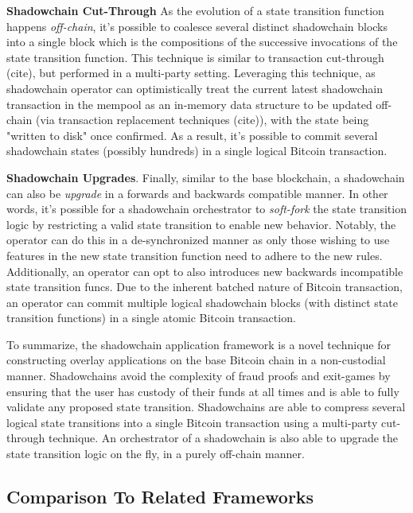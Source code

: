 \documentclass[12pt,a4paper]{article}
\theoremstyle{definition}
\begin{document}
\textbf{Shadowchain Cut-Through} As the evolution of a state transition
function happens \emph{off-chain}, it's possible to coalesce several distinct
shadowchain blocks into a single block which is the compositions of the
successive invocations of the state transition function. This technique is
similar to transaction cut-through (cite), but performed in a multi-party
setting. Leveraging this technique, as shadowchain operator can optimistically
treat the current latest shadowchain transaction in the mempool as an in-memory
data structure to be updated off-chain (via transaction replacement techniques
(cite)), with the state being "written to disk" once confirmed. As a result,
it's possible to commit several shadowchain states (possibly hundreds) in a
single logical Bitcoin transaction.

\textbf{Shadowchain Upgrades}. Finally, similar to the base blockchain, a
shadowchain can also be \emph{upgrade} in a forwards and backwards compatible
manner. In other words, it's possible for a shadowchain orchestrator to
\emph{soft-fork} the state transition logic by restricting a valid state
transition to enable new behavior. Notably, the operator can do this in a
de-synchronized manner as only those wishing to use features in the new state
transition function need to adhere to the new rules. Additionally, an operator
can opt to also introduces new backwards incompatible state transition funcs.
Due to the inherent batched nature of Bitcoin transaction, an operator can
commit multiple logical shadowchain blocks (with distinct state transition
functions) in a single atomic Bitcoin transaction.

To summarize, the shadowchain application framework is a novel technique for
constructing overlay applications on the base Bitcoin chain in a non-custodial
manner. Shadowchains avoid the complexity of fraud proofs and exit-games by
ensuring that the user has custody of their funds at all times and is able to
fully validate any proposed state transition. Shadowchains are able to compress
several logical state transitions into a single Bitcoin transaction using a
multi-party cut-through technique. An orchestrator of a shadowchain is also
able to upgrade the state transition logic on the fly, in a purely off-chain
manner.


\subsection{Comparison To Related Frameworks}
\end{document}
